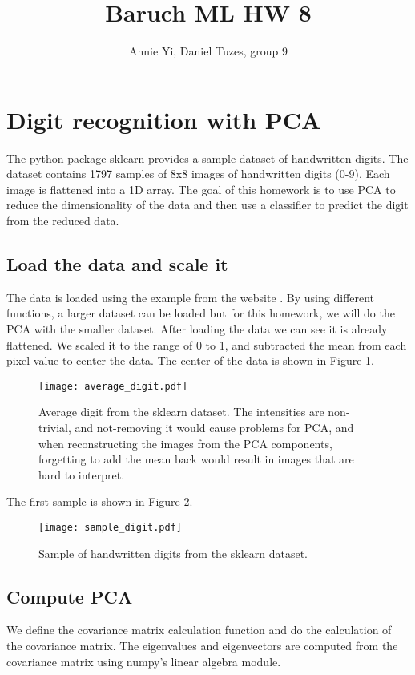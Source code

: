 \documentclass{article}
\title{Baruch ML HW 8}
\author{Annie Yi, Daniel Tuzes, group 9}
\begin{document}
\maketitle

\tableofcontents

\section{Digit recognition with PCA}
The python package sklearn provides a sample dataset of handwritten digits.
The dataset contains 1797 samples of 8x8 images of handwritten digits (0-9).
Each image is flattened into a 1D array.
The goal of this homework is to use PCA to reduce the dimensionality of the data and
then use a classifier to predict the digit from the reduced data.

\subsection{Load the data and scale it}
The data is loaded using the example from the website \cite{sklearn_digits}.
By using different functions, a larger dataset can be loaded \cite{sklearn_openml}
but for this homework, we will do the PCA with the smaller dataset.
After loading the data we can see it is already flattened.
We scaled it to the range of 0 to 1,
and subtracted the mean from each pixel value to center the data.
The center of the data is shown in Figure \ref{fig:average_digit}.

\begin{figure}

    \centering
    \texttt{[image: average\_digit.pdf]}
    \caption{Average digit from the sklearn dataset.
        The intensities are non-trivial,
        and not-removing it would cause problems for PCA,
        and when reconstructing the images from the PCA components,
        forgetting to add the mean back would result in images that are hard to interpret.}
    \label{fig:average_digit}
\end{figure}

The first sample is shown in Figure \ref{fig:digits_sample}.

\begin{figure}[h!]
    \centering
    \texttt{[image: sample\_digit.pdf]}
    \caption{Sample of handwritten digits from the sklearn dataset.}
    \label{fig:digits_sample}
\end{figure}

\subsection{Compute PCA}
We define the covariance matrix calculation function and
do the calculation of the covariance matrix.
The eigenvalues and eigenvectors are computed from the covariance matrix
using numpy's linear algebra module.
\end{document}
